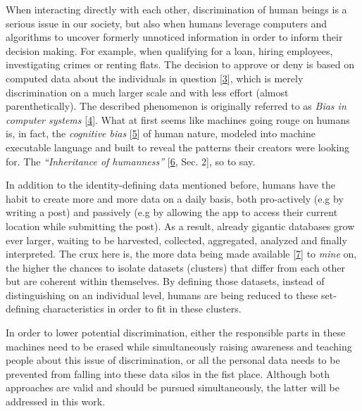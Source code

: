 \documentclass[12pt,english,a4paper,titlepage,cleardoublepage=empty,dottedtoc]{report}
\begin{document}
When interacting directly with each other, discrimination of human
beings is a serious issue in our society, but also when humans leverage
computers and algorithms to uncover formerly unnoticed information in
order to inform their decision making. For example, when qualifying for
a loan, hiring employees, investigating crimes or renting flats. The
decision to approve or deny is based on computed data about the
individuals in question
{[}\protect\hyperlink{ref-book_2015_ethical-it-innovation_ethical-uses-of-information-and-knowledge}{3}{]},
which is merely discrimination on a much larger scale and with less
effort (almost parenthetically). The described phenomenon is originally
referred to as \emph{Bias in computer systems}
{[}\protect\hyperlink{ref-paper_1996_bias-in-computer-systems}{4}{]}.
What at first seems like machines going rouge on humans is, in fact, the
\emph{cognitive bias}
{[}\protect\hyperlink{ref-wikipedia_2016_cognitive-bias}{5}{]} of human
nature, modeled into machine executable language and built to reveal the
patterns their creators were looking for. The \emph{``Inheritance of
humanness''} {[}\protect\hyperlink{ref-web_2016_big-data-is-people}{6},
Sec. 2{]}, so to say.

In addition to the identity-defining data mentioned before, humans have
the habit to create more and more data on a daily basis, both
pro-actively (e.g by writing a post) and passively (e.g by allowing the
app to access their current location while submitting the post). As a
result, already gigantic databases grow ever larger, waiting to be
harvested, collected, aggregated, analyzed and finally interpreted. The
crux here is, the more data being made available
{[}\protect\hyperlink{ref-video_2015_big-data-and-deep-learning_discrimination}{7}{]}
to \emph{mine} on, the higher the chances to isolate datasets (clusters)
that differ from each other but are coherent within themselves. By
defining those datasets, instead of distinguishing on an individual
level, humans are being reduced to these set-defining characteristics in
order to fit in these clusters.

In order to lower potential discrimination, either the responsible parts
in these machines need to be erased while simultaneously raising
awareness and teaching people about this issue of discrimination, or all
the personal data needs to be prevented from falling into these data
silos in the fist place. Although both approaches are valid and should
be pursued simultaneously, the latter will be addressed in this work.
\end{document}

